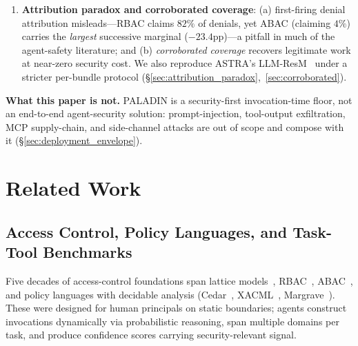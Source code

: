\documentclass[sigconf,review,anonymous]{acmart}
\begin{document}
\begin{enumerate}
  \item \textbf{Attribution paradox and corroborated coverage}: (a) first-firing denial attribution misleads---RBAC claims $82\%$ of denials, yet ABAC (claiming $4\%$) carries the \emph{largest} successive marginal ($-23.4$pp)---a pitfall in much of the agent-safety literature; and (b) \emph{corroborated coverage} recovers legitimate work at near-zero security cost. We also reproduce ASTRA's LLM-ResM~\cite{elhelou2025astra} under a stricter per-bundle protocol (\S\ref{sec:attribution_paradox},~\ref{sec:corroborated}).
\end{enumerate}

\noindent\textbf{What this paper is not.} PALADIN is a security-first invocation-time floor, not an end-to-end agent-security solution: prompt-injection, tool-output exfiltration, MCP supply-chain, and side-channel attacks are out of scope and compose with it (\S\ref{sec:deployment_envelope}).

\section{Related Work}
\label{sec:related}

\subsection{Access Control, Policy Languages, and Task-Tool Benchmarks}
\label{sec:access_control}

Five decades of access-control foundations span lattice models~\cite{bell1973secure}, RBAC~\cite{sandhu1996role,ferraiolo2001proposed}, ABAC~\cite{hu2014guide}, and policy languages with decidable analysis (Cedar~\cite{cutler2024cedar}, XACML~\cite{oasis2013xacml}, Margrave~\cite{fisler2005verification}). These were designed for human principals on static boundaries; agents construct invocations dynamically via probabilistic reasoning, span multiple domains per task, and produce confidence scores carrying security-relevant signal.
\end{document}
